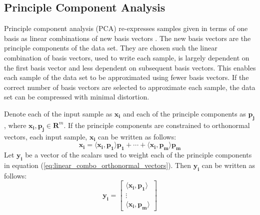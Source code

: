 \documentclass[conference]{IEEEtran}
\begin{document}
    \subsection{Principle Component Analysis}
    
    Principle component analysis (PCA) re-expresses samples given in terms of one basis as linear combinations of new basis vectors \cite{shlens_2014_tutorial}. The new basis vectors are the principle components of the data set. They are chosen such the linear combination of basis vectors, used to write each sample, is largely dependent on the first basis vector and less dependent on subsequent basis vectors. This enables each sample of the data set to be approximated using fewer basis vectors. If the correct number of basis vectors are selected to approximate each sample, the data set can be compressed with minimal distortion.
    
    Denote each of the input sample as $\mathbf{x_i}$ and each of the principle components as $\mathbf{p_j}$, where $\mathbf{x_i}, \mathbf{p_j} \in \mathbf{R}^{m}$. If the principle components are constrained to orthonormal vectors, each input sample, $\mathbf{x_i}$ can be written as follows:
    \begin{equation}
    		\mathbf{x_i} = \langle \mathbf{x_i}, \mathbf{p_1} \rangle \mathbf{p_1} + \cdots + \langle \mathbf{x_i}, \mathbf{p_m} \rangle \mathbf{p_m}
    		\label{eq:linear_combo_orthonormal_vectors}
    	\end{equation}
    	Let $\mathbf{y_i}$ be a vector of the scalars used to weight each of the principle components in equation (\ref{eq:linear_combo_orthonormal_vectors}). Then $\mathbf{y_i}$ can be written as follows:
    	\begin{equation}
        \mathbf{y_i} = \begin{bmatrix}
                        \langle \mathbf{x_i}, \mathbf{p_1} \rangle\\
                        \vdots \\
                        \langle \mathbf{x_i}, \mathbf{p_m}\rangle
                        \end{bmatrix}
    \end{equation}
    
\end{document}
